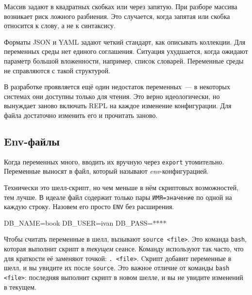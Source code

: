 
Массив задают в квадратных скобках или через запятую. При разборе массива
возникает риск ложного разбиения. Это случается, когда запятая или скобка
относится к слову, а не к синтаксису.


Форматы JSON и YAML задают четкий стандарт, как описывать коллекции. Для
переменных среды нет единого соглашения. Ситуация ухудшается, когда ожидают
параметр большой вложенности, например, список словарей. Переменные среды не
справляются с такой структурой.

В разработке проявляется ещё один недостаток переменных~--- в некоторых системах
они доступны только для чтения. Это верно идеологически, но вынуждает заново
включать REPL на каждое изменение конфигурации. Для файла достаточно изменить
его и прочитать заново.

\subsection{Env-файлы}


Когда переменных много, вводить их вручную через \verb|export|
утомительно. Переменные выносят в файл, который называют
\emph{env}-конфигурацией.

Технически это шелл-скрипт, но чем меньше в нём скриптовых возможностей, тем
лучше. В идеале файл содержит только пары \verb|ИМЯ=значение| по одной на каждую
строку. Назовем его просто \verb|ENV| без расширения.

\begin{english}
  \begin{bash}
DB_NAME=book
DB_USER=ivan
DB_PASS=****
  \end{bash}
\end{english}

Чтобы считать переменные в шелл, вызывают \verb|source <file>|. Это команда
\verb|bash|, которая выполнит скрипт в \emph{текущем} сеансе. Команду используют
так часто, что для краткости её заменяют точкой: \verb|. <file>|. Cкрипт добавит
переменные в шелл, и вы увидите их после \verb|source|. Это важное отличие от
команды \verb|bash <file>|: последняя выполнит скрипт в новом шелле, и вы не
увидите изменений в текущем.

\begin{english}
\end{english}

